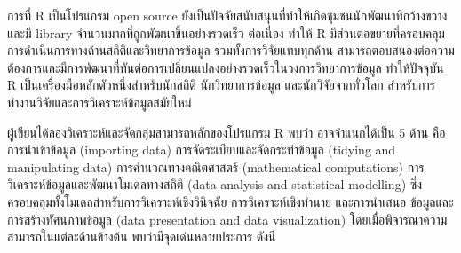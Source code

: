 \documentclass[
  a4paper,
]{book}
\begin{document}
การที่ R เป็นโปรแกรม open source
ยังเป็นปัจจัยสนับสนุนที่ทำให้เกิดชุมชนนักพัฒนาที่กว้างขวางและมี library
จำนวนมากที่ถูกพัฒนาขึ้นอย่างรวดเร็ว ต่อเนื่อง ทำให้ R
มีส่วนต่อขยายที่ครอบคลุมการดำเนินการทางด้านสถิติและวิทยาการข้อมูล รวมทั้งการวิจัยแทบทุกด้าน
สามารถตอบสนองต่อความต้องการและมีการพัฒนาที่ทันต่อการเปลี่ยนแปลงอย่างรวดเร็วในวงการวิทยาการข้อมูล
ทำให้ปัจจุบัน R เป็นเครื่องมือหลักตัวหนึ่งสำหรับนักสถิติ นักวิทยาการข้อมูล และนักวิจัยจากทั่วโลก
สำหรับการทำงานวิจัยและการวิเคราะห์ข้อมูลสมัยใหม่

ผู้เขียนได้ลองวิเคราะห์และจัดกลุ่มสามารถหลักของโปรแกรม R พบว่า อาจจำแนกได้เป็น 5 ด้าน
คือ การนำเข้าข้อมูล (importing data) การจัดระเบียบและจัดกระทำข้อมูล (tidying and
manipulating data) การคำนวณทางคณิตศาสตร์ (mathematical computations)
การวิเคราะห์ข้อมูลและพัฒนาโมเดลทางสถิติ (data analysis and statistical
modelling) ซึ่งครอบคลุมทั้งโมเดลสำหรับการวิเคราะห์เชิงวินิจฉัย การวิเคราะห์เชิงทำนาย
และการนำเสนอ ข้อมูลและการสร้างทัศนภาพข้อมูล (data presentation and data
visualization) โดยเมื่อพิจารณาความสามารถในแต่ละด้านข้างต้น พบว่ามีจุดเด่นหลายประการ
ดังนี
\end{document}
